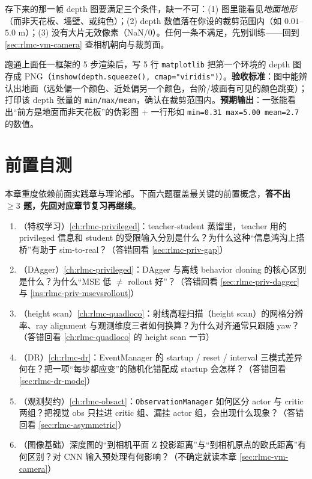 存下来的那一帧 depth 图要满足三个条件，缺一不可：(1) 图里能看见\emph{地面地形}（而非天花板、墙壁、或纯色）；(2) depth 数值落在你设的裁剪范围内（如 $0.01$--$5.0$ m）；(3) 没有大片无效像素（NaN/0）。任何一条不满足，先别训练——回到 \cref{sec:rlmc-vm-camera} 查相机朝向与裁剪面。

\begin{practice}
跑通上面任一框架的 5 步渲染后，写 5 行 \verb|matplotlib| 把第一个环境的 depth 图存成 PNG（\verb|imshow(depth.squeeze(), cmap="viridis")|）。\textbf{验收标准}：图中能辨认出地面（远处偏一个颜色、近处偏另一个颜色，台阶/坡面有可见的颜色跳变）；打印该 depth 张量的 \verb|min/max/mean|，确认在裁剪范围内。\textbf{预期输出}：一张能看出“前方是地面而非天花板”的伪彩图 + 一行形如 \verb|min=0.31 max=5.00 mean=2.7| 的数值。
\end{practice}

\section{前置自测}
\label{sec:rlmc-vm-pretest}

本章重度依赖前面实践章与理论部。下面六题覆盖最关键的前置概念，\textbf{答不出 $\ge 3$ 题，先回对应章节复习再继续}。

\begin{practice}[开课前自测]
\begin{enumerate}
\item （特权学习）\cref{ch:rlmc-privileged}：teacher-student 蒸馏里，teacher 用的 privileged 信息和 student 的受限输入分别是什么？为什么这种“信息鸿沟上搭桥”有助于 sim-to-real？（答错回看 \cref{sec:rlmc-priv-gap}）
\item （DAgger）\cref{ch:rlmc-privileged}：DAgger 与离线 behavior cloning 的核心区别是什么？为什么“MSE 低 $\ne$ rollout 好”？（答错回看 \cref{sec:rlmc-priv-dagger} 与 \cref{ins:rlmc-priv-msevsrollout}）
\item （height scan）\cref{ch:rlmc-quadloco}：射线高程扫描（height scan）的网格分辨率、ray alignment 与观测维度三者如何换算？为什么对齐通常只跟随 yaw？（答错回看 \cref{ch:rlmc-quadloco} 的 height scan 一节）
\item （DR）\cref{ch:rlmc-dr}：EventManager 的 startup / reset / interval 三模式差异何在？把一项“每步都应变”的随机化错配成 startup 会怎样？（答错回看 \cref{sec:rlmc-dr-mode}）
\item （观测契约）\cref{ch:rlmc-obsact}：\verb|ObservationManager| 如何区分 actor 与 critic 两组？把视觉 obs 只挂进 critic 组、漏挂 actor 组，会出现什么现象？（答错回看 \cref{sec:rlmc-asymmetric}）
\item （图像基础）深度图的“到相机平面 Z 投影距离”与“到相机原点的欧氏距离”有何区别？对 CNN 输入预处理有何影响？（不确定就读本章 \cref{sec:rlmc-vm-camera}）
\end{enumerate}
\end{practice}


